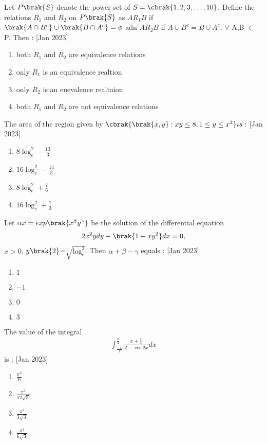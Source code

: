 	\item Let $P\brak{S}$ denote the power set of $S =\cbrak{1,2,3,\ldots,10}$. Define the relations $R_1$ and $R_2$ on $P\brak{S}$ as $AR_1B$ if $\brak {A \cap B^c}\cup \brak{B\cap A^c}=\phi$ adn $AR_2B$ if $A\cup B^c=B\cup A^c$, $\forall$ A,B $\in$ P. Then :
		\hfill{[Jan 2023]}
		\begin{enumerate}
			\item both $R_1$ and $R_2$ are equivalence relations
			\item only $R_1$ is an equivalence realtion
			\item only $R_2$ is an euevalence realtaion
			\item both $R_1$ and $R_2$ are not equivalence relations
        	\end{enumerate}	
	\item The area of the region given by $\cbrak{\brak{x,y}:xy \leq 8, 1 \leq y \leq x^2 } is :$
		\hfill{[Jan 2023]}
		\begin{enumerate}
			\item $8 \log^{2}_e-\frac{13}{3}$
			\item $16 \log^{2}_e-\frac{14}{3}$
			\item $8 \log^{2}_e+\frac{7}{6}$
			\item $16 \log^{2}_e+\frac{7}{3}$
        	\end{enumerate}	
	\item Let $\alpha x=exp\brak{x^\beta y^\gamma}$ be the solution of the differential equation 
             \begin{align*}
		2x^2ydy-\brak{1-xy^2}dx=0,
             \end{align*}
	 $x>0$, $y\brak{2}$=$\sqrt{\log_e^2}$. Then $\alpha + \beta - \gamma$ equals :
	 	\hfill{[Jan 2023]}
		\begin{enumerate}
			\item $1$
			\item $-1$
			\item $0$
			\item $3$
        	\end{enumerate}
	\item The value of the integral 
             \begin{align*}
		\int_\frac{-\pi}{4}^\frac{\pi}{4}\frac{x+\frac{\pi}{4}}{2-\cos 2x}dx
             \end{align*}
	     is :
	     	\hfill{[Jan 2023]}
		\begin{enumerate}
			\item $\frac{\pi^2}{6}$
			\item $\frac{\pi^2}{12\sqrt{3}}$
	         	\item $\frac{\pi^2}{3\sqrt{3}}$
                 	\item $\frac{\pi^2}{6\sqrt{3}}$
	\end{enumerate}	

